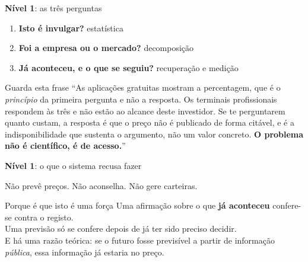 \documentclass[aspectratio=169]{beamer}
\newcommand{\key}[1]{\textbf{\textcolor{blue!55!black}{#1}}}
\begin{document}
\begin{frame}{\key{Nível 1}: as três perguntas}
\begin{enumerate}
  \item \key{Isto é invulgar?} estatística
  \item \key{Foi a empresa ou o mercado?} decomposição
  \item \key{Já aconteceu, e o que se seguiu?} recuperação e medição
\end{enumerate}
\vspace{4mm}
\begin{block}{Guarda esta frase}
``As aplicações gratuitas mostram a percentagem, que é o \emph{princípio} da primeira pergunta e não
a resposta. Os terminais profissionais respondem às três e não estão ao alcance deste
investidor. Se te perguntarem quanto custam, a resposta é que o preço não é publicado de
forma citável, e é a indisponibilidade que sustenta o argumento, não um valor concreto.
\textbf{O problema não é científico, é de acesso.}''
\end{block}
\end{frame}

\begin{frame}{\key{Nível 1}: o que o sistema recusa fazer}
\begin{center}
\Large Não prevê preços. Não aconselha. Não gere carteiras.
\end{center}
\vspace{5mm}
\begin{block}{Porque é que isto é uma força}
Uma afirmação sobre o que \textbf{já aconteceu} confere-se contra o registo.\\
Uma previsão só se confere depois de já ter sido preciso decidir.\\[2mm]
E há uma razão teórica: se o futuro fosse previsível a partir de informação \emph{pública}, essa
informação já estaria no preço.
\end{block}
\end{frame}
\end{document}
